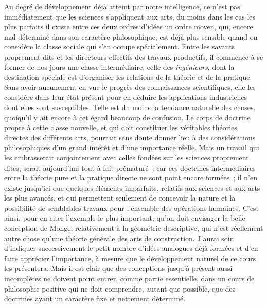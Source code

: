 \documentclass[french,twoside]{book} %
\begin{document}
Au degré de développement déjà atteint par notre intelligence, ce n’est pas immédiatement que les sciences s’appliquent aux arts, du moins dans les cas les plus parfaits il existe entre ces deux ordres d’idées un ordre moyen, qui, encore mal déterminé dans son caractère philosophique, est déjà plus sensible quand on considère la classe sociale qui s’en occupe spécialement. Entre les savants proprement dits et les directeurs effectifs des travaux productifs, il commence à se former de nos jours une classe intermédiaire, celle des {\itshape ingénieurs}, dont la destination spéciale est d’organiser les relations de la théorie et de la pratique. Sans avoir aucunement en vue le progrès des connaissances scientifiques, elle les considère dans leur état présent pour en déduire les applications industrielles dont elles sont susceptibles. Telle est du moins la tendance naturelle des choses, quoiqu’il y ait encore à cet égard beaucoup de confusion. Le corps de doctrine propre à cette classe nouvelle, et qui doit constituer les véritables théories directes des différents arts, pourrait sans doute donner lieu à des considérations philosophiques d’un grand intérêt et d’une importance réelle. Mais un travail qui les embrasserait conjointement avec celles fondées sur les sciences proprement dites, serait aujourd’hui tout à fait prématuré ; car ces doctrines intermédiaires entre la théorie pure et la pratique directe ne sont point encore formées ; il n’en existe jusqu’ici que quelques éléments imparfaits, relatifs aux sciences et aux arts les plus avancés, et qui permettent seulement de concevoir la nature et la possibilité de semblables travaux pour l’ensemble des opérations humaines. C’est ainsi, pour en citer l’exemple le plus important, qu’on doit envisager la belle conception de Monge, relativement à la géométrie descriptive, qui n’est réellement autre chose qu’une théorie générale des arts de construction. J’aurai soin d’indiquer successivement le petit nombre d’idées analogues déjà formées et d’en faire apprécier l’importance, à mesure que le développement naturel de ce cours les présentera. Mais il est clair que des conceptions jusqu’à présent aussi incomplètes ne doivent point entrer, comme partie essentielle, dans un cours de philosophie positive qui ne doit comprendre, autant que possible, que des doctrines ayant un caractère fixe et nettement déterminé.\par
\end{document}
